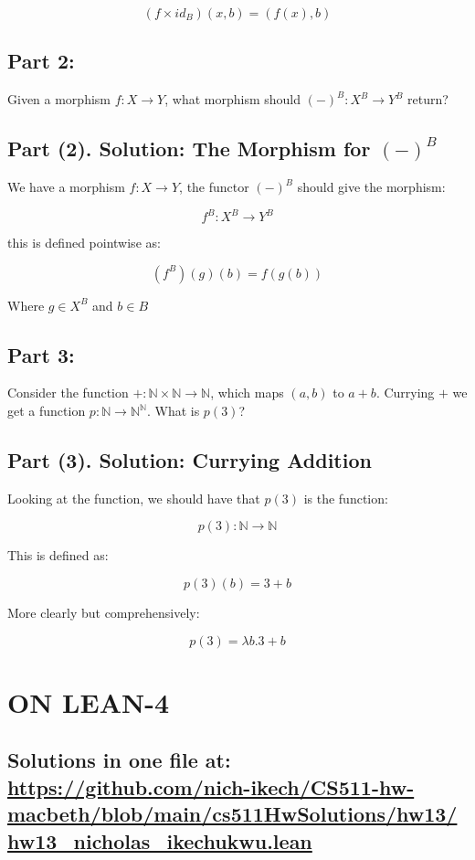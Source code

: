 \documentclass{article}
\begin{document}
 \[ (f \times id_B)(x,b) = (f(x), b) \]

 \newpage

 \subsection*{Part 2:  } 
 Given a morphism $f : X \to Y$, what morphism should $(-)^B : X^B \to Y^B$ return?
  \subsection*{Part (2). Solution: The Morphism for $(-)^B$}

  
  We have a morphism $f: X \to Y$, the functor $(-)^B$ should give the morphism:
  
  \[ f^B : X^B \to Y^B \]
  
  this is defined pointwise as:
  
  \[ (f^B)(g)(b) = f(g(b)) \]
  
  Where $g \in X^B$ and $b \in B$

 \newpage


 \subsection*{Part 3:  } 
 Consider the function $+ : \mathbb{N} \times \mathbb{N} \to \mathbb{N}$, which maps $(a,b)$ to $a + b$. Currying $+$ we get a function $p : \mathbb{N} \to \mathbb{N}^{\mathbb{N}}$. What is $p(3)$?
  \subsection*{Part (3). Solution: Currying Addition}


  Looking at the function, we should have that $p(3)$ is the function:
  
  \[ p(3) : \mathbb{N} \to \mathbb{N} \]
  
  This is defined as:
  
  \[ p(3)(b) = 3 + b \]
  
  More clearly but comprehensively:
  
  \[ p(3) = \lambda b. 3 + b \]



\newpage



\section*{ON LEAN-4}
\subsection*{Solutions in one file at: 
\url{https://github.com/nich-ikech/CS511-hw-macbeth/blob/main/cs511HwSolutions/hw13/hw13_nicholas_ikechukwu.lean}}
 
\end{document}
